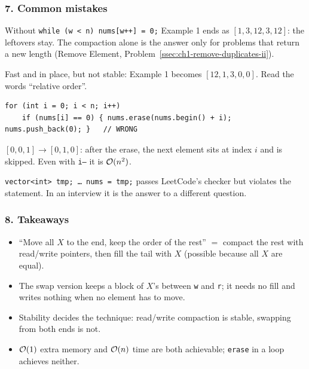 \subsubsection*{7. Common mistakes}

\begin{warningbox}
Without \texttt{while (w < n) nums[w++] = 0;} Example 1 ends as $[1, 3, 12, 3, 12]$: the leftovers stay. The compaction alone is the answer only for problems that return a new length (Remove Element, Problem~\ref{ssec:ch1-remove-duplicates-ii}).
\end{warningbox}

\begin{warningbox}
Fast and in place, but not stable: Example 1 becomes $[12, 1, 3, 0, 0]$. Read the words ``relative order''.
\end{warningbox}

\begin{warningbox}
\begin{lstlisting}[style=snippet]
for (int i = 0; i < n; i++)
    if (nums[i] == 0) { nums.erase(nums.begin() + i); nums.push_back(0); }   // WRONG
\end{lstlisting}
$[0, 0, 1] \to [0, 1, 0]$: after the erase, the next element sits at index $i$ and is skipped. Even with \texttt{i--} it is $\mathcal{O}(n^2)$.
\end{warningbox}

\begin{warningbox}
\texttt{vector<int> tmp; \ldots{} nums = tmp;} passes LeetCode's checker but violates the statement. In an interview it is the answer to a different question.
\end{warningbox}

\subsubsection*{8. Takeaways}

\begin{itemize}[leftmargin=*]
    \item ``Move all $X$ to the end, keep the order of the rest'' $=$ compact the rest with read/write pointers, then fill the tail with $X$ (possible because all $X$ are equal).
    \item The swap version keeps a block of $X$'s between \texttt{w} and \texttt{r}; it needs no fill and writes nothing when no element has to move.
    \item Stability decides the technique: read/write compaction is stable, swapping from both ends is not.
    \item $\mathcal{O}(1)$ extra memory and $\mathcal{O}(n)$ time are both achievable; \texttt{erase} in a loop achieves neither.
\end{itemize}

